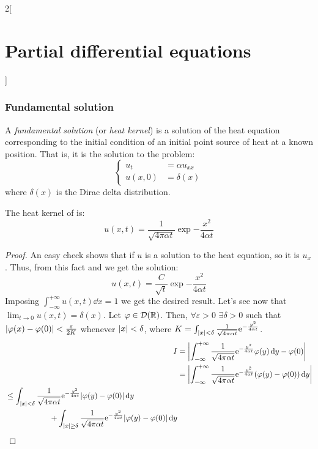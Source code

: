\documentclass[../../../main_math.tex]{subfiles}
\begin{document}
\begin{multicols}{2}[\section{Partial differential equations}]
  \subsubsection{Fundamental solution}
  \begin{definition}
    A \emph{fundamental solution} (or \emph{heat kernel}) is a solution of the heat equation corresponding to the initial condition of an initial point source of heat at a known position. That is, it is the solution to the problem:
    \begin{equation}\label{PDE:fundamental}
      \left\{
      \begin{aligned}
        u_{t}  & =\alpha u_{xx} \\
        u(x,0) & =\delta(x)
      \end{aligned}
      \right.
    \end{equation}
    where $\delta(x)$ is the Dirac delta distribution.
  \end{definition}
  \begin{theorem}\label{PDE:heatkernelprop}
    The heat kernel of  is:
    \begin{equation}\label{PDE:heatkernel}
      u(x,t)=\frac{1}{\sqrt{4\pi\alpha t}}\exp{-\frac{x^2}{4\alpha t}}
    \end{equation}
  \end{theorem}
  \begin{proof}
    An easy check shows that if $u$ is a solution to the heat equation, so it is $u_x$. Thus, from this fact and  we get the solution:
    $$u(x,t)=\frac{C}{\sqrt{t}}\exp{-\frac{x^2}{4\alpha t}}$$
    Imposing $\int_{-\infty}^{+\infty}u(x,t)\dd{x}=1$ we get the desired result. Let's see now that $\displaystyle\lim_{t\to 0}u(x,t)=\delta(x)$. Let $\varphi\in\mathcal{D}(\mathbb{R})$. Then, $\forall \varepsilon>0$ $\exists\delta>0$ such that $\abs{\varphi(x)-\varphi(0)}<\frac{\varepsilon}{2K}$ whenever $\abs{x}<\delta$, where $K=\int_{\abs{x}<\delta}\frac{1}{\sqrt{4\pi\alpha t}}\mathrm{e}^{-\frac{y^2}{4\alpha t}}$.
    \begin{align*}
      I & =\abs{\int_{-\infty}^{+\infty}\frac{1}{\sqrt{4\pi\alpha t}}\exp{-\frac{y^2}{4\alpha t}}\varphi(y)\dd{y}-\varphi(0)}    \\
        & = \abs{\int_{-\infty}^{+\infty}\frac{1}{\sqrt{4\pi\alpha t}}\exp{-\frac{y^2}{4\alpha t}}(\varphi(y)-\varphi(0))\dd{y}} \\
      \begin{split}
        &\leq \int_{\abs{x}<\delta}\frac{1}{\sqrt{4\pi\alpha t}}\exp{-\frac{y^2}{4\alpha t}}\abs{\varphi(y)-\varphi(0)}\dd{y}\\&\hspace{2cm}+\int_{\abs{x}\geq\delta}\frac{1}{\sqrt{4\pi\alpha t}}\exp{-\frac{y^2}{4\alpha t}}\abs{\varphi(y)-\varphi(0)}\dd{y}

\end{split}
\end{align*}
\end{proof}
\end{multicols}
\end{document}
